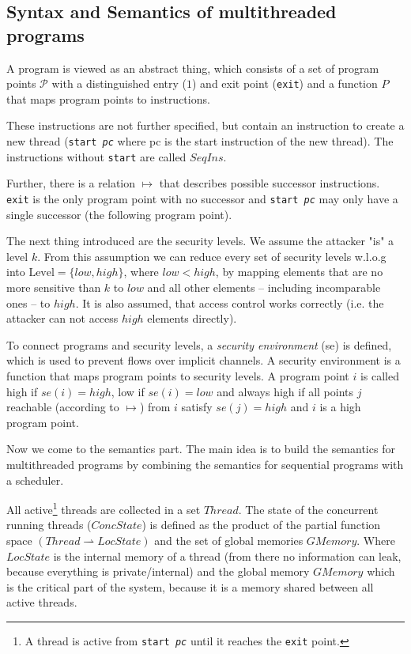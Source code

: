 \documentclass[a4paper,10pt]{llncs}
\begin{document}
\subsection{Syntax and Semantics of multithreaded programs}
\label{sec:syntaxsemantics}
A program is viewed as an abstract thing, which consists of a set of
program points $\mathcal{P}$ with a distinguished entry ($1$) and exit
point (\texttt{exit}) and a function $P$ that maps program points to
instructions.

These instructions are not further specified, but contain an instruction
to create a new thread (\texttt{start \textit{pc}} where pc is the start
instruction of the new thread). The instructions without \texttt{start}
are called $SeqIns$.

Further, there is a relation $\mapsto$ that describes possible successor
instructions. \texttt{exit} is the only program point with no successor
and \texttt{start \textit{pc}} may only have a single successor (the
following program point).

The next thing introduced are the security levels. We assume the attacker
"is" a level $k$. From this assumption we can reduce every set of security levels
w.l.o.g into $\text{Level} = \{low, high\}$, where $low < high$, by mapping elements
that are no more sensitive than $k$ to $low$ and all other elements
-- including incomparable ones -- to $high$. It is also assumed, that access
control works correctly (i.e. the attacker can not access $high$ elements
directly).

To connect programs and security levels, a \textit{security environment}
(se) is defined, which is used to prevent flows over implicit channels.
A security environment is a function that maps program points to security
levels. A program point $i$ is called high if $se(i) = high$, low if $se(i)
= low$ and always high if all points $j$ reachable (according to $\mapsto$)
from $i$ satisfy $se(j) = high$ and $i$ is a high program point.

Now we come to the semantics part. The main idea is to build the semantics
for multithreaded programs by combining the semantics for sequential programs
with a scheduler.

All active\footnote{A thread is active from \texttt{start \textit{pc}} until
it reaches the \texttt{exit} point.} threads are collected in a set $Thread$.
The state of the concurrent running threads ($ConcState$) is defined as the
product of the partial function space $(Thread \rightharpoonup LocState)$
and the set of global memories $GMemory$. Where $LocState$ is the internal
memory of a thread (from there no information can leak, because everything is private/internal) and the global memory $GMemory$ which is
the critical part of the system, because it is a memory shared between all
active threads.
\end{document}
